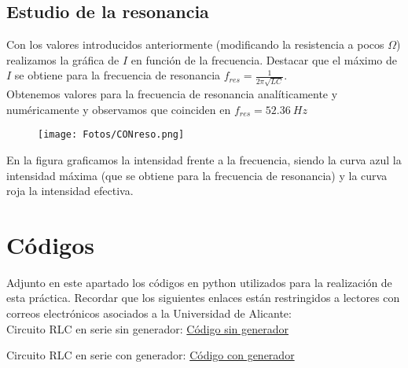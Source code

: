 \documentclass{article}
\begin{document}
    \subsection{Estudio de la resonancia}
    Con los valores introducidos anteriormente (modificando la resistencia a pocos $\Omega$) realizamos la gráfica de $I$ en función de la frecuencia. Destacar que el máximo de $I$ se obtiene para la frecuencia de resonancia $f_{res} = \frac{1}{2\pi \sqrt{LC}}$.\\
    
    Obtenemos valores para la frecuencia de resonancia analíticamente y numéricamente y observamos que coinciden en $f_{res} = 52.36\ Hz$
    
    \begin{figure}[h]
        \centering
        \texttt{[image: Fotos/CONreso.png]}
    \end{figure}
        
    En la figura graficamos la intensidad frente a la frecuencia, siendo la curva azul la intensidad máxima (que se obtiene para la frecuencia de resonancia) y la curva roja la intensidad efectiva.
    

\clearpage
\section{Códigos}
    \noindent Adjunto en este apartado los códigos en python utilizados para la realización de esta práctica. Recordar que los siguientes enlaces están restringidos a lectores con correos electrónicos asociados a la Universidad de Alicante: \\
    
    \noindent Circuito RLC en serie sin generador: \href{https://colab.research.google.com/drive/13GIrx54IEKJPyuWR2zWD0QK0Csr4QSl8?usp=sharing}{Código sin generador} 
    
    \vspace{.3cm}
    \noindent Circuito RLC en serie con generador: \href{https://colab.research.google.com/drive/1wUlrRMlpS3oeaVdSZSz8MbYVYWOmFezm?usp=sharing}{Código con generador} 
\end{document}
